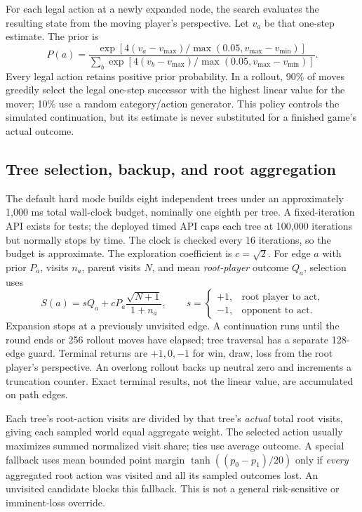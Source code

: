 \documentclass{article}
\begin{document}
For each legal action at a newly expanded node, the search evaluates the resulting state from the moving player's perspective. Let $v_a$ be that one-step estimate. The prior is
\begin{equation}
P(a)=\frac{\exp\left[4(v_a-v_{\max})/\max(0.05,v_{\max}-v_{\min})\right]}
{\sum_b\exp\left[4(v_b-v_{\max})/\max(0.05,v_{\max}-v_{\min})\right]}.
\label{eq:prior}
\end{equation}
Every legal action retains positive prior probability. In a rollout, 90\% of moves greedily select the legal one-step successor with the highest linear value for the mover; 10\% use a random category/action generator. This policy controls the simulated continuation, but its estimate is never substituted for a finished game's actual outcome.

\subsection{Tree selection, backup, and root aggregation}

The default hard mode builds eight independent trees under an approximately 1{,}000 ms total wall-clock budget, nominally one eighth per tree. A fixed-iteration API exists for tests; the deployed timed API caps each tree at 100{,}000 iterations but normally stops by time. The clock is checked every 16 iterations, so the budget is approximate. The exploration coefficient is $c=\sqrt{2}$. For edge $a$ with prior $P_a$, visits $n_a$, parent visits $N$, and mean \emph{root-player} outcome $Q_a$, selection uses
\begin{equation}
S(a)=s Q_a+cP_a\frac{\sqrt{N+1}}{1+n_a},\qquad
s=\begin{cases}+1,&\text{root player to act},\\-1,&\text{opponent to act}.\end{cases}
\label{eq:puct}
\end{equation}
Expansion stops at a previously unvisited edge. A continuation runs until the round ends or 256 rollout moves have elapsed; tree traversal has a separate 128-edge guard. Terminal returns are $+1,0,-1$ for win, draw, loss from the root player's perspective. An overlong rollout backs up neutral zero and increments a truncation counter. Exact terminal results, not the linear value, are accumulated on path edges.

Each tree's root-action visits are divided by that tree's \emph{actual} total root visits, giving each sampled world equal aggregate weight. The selected action usually maximizes summed normalized visit share; ties use average outcome. A special fallback uses mean bounded point margin $\tanh((p_0-p_1)/20)$ only if \emph{every} aggregated root action was visited and all its sampled outcomes lost. An unvisited candidate blocks this fallback. This is not a general risk-sensitive or imminent-loss override.
\end{document}
